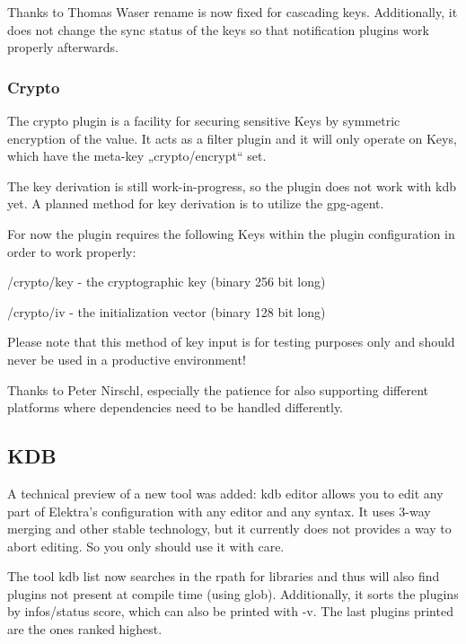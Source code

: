Thanks to Thomas Waser {\ttfamily rename} is now fixed for cascading keys. Additionally, it does not change the {\ttfamily sync} status of the keys so that notification plugins work properly afterwards.

\subsubsection*{Crypto}

The crypto plugin is a facility for securing sensitive Keys by symmetric encryption of the value. It acts as a filter plugin and it will only operate on Keys, which have the meta-\/key „crypto/encrypt“ set.

The key derivation is still work-\/in-\/progress, so the plugin does not work with kdb yet. A planned method for key derivation is to utilize the gpg-\/agent.

For now the plugin requires the following Keys within the plugin configuration in order to work properly\+:


\begin{DoxyEnumerate}
\item /crypto/key -\/ the cryptographic key (binary 256 bit long)
\item /crypto/iv -\/ the initialization vector (binary 128 bit long)
\end{DoxyEnumerate}

Please note that this method of key input is for testing purposes only and should never be used in a productive environment!

Thanks to Peter Nirschl, especially the patience for also supporting different platforms where dependencies need to be handled differently.

\subsection*{K\+D\+B}

A technical preview of a new tool was added\+: {\ttfamily kdb editor} allows you to edit any part of Elektra's configuration with any editor and any syntax. It uses 3-\/way merging and other stable technology, but it currently does not provides a way to abort editing. So you only should use it with care.

The tool {\ttfamily kdb list} now searches in the rpath for libraries and thus will also find plugins not present at compile time (using {\ttfamily glob}). Additionally, it sorts the plugins by {\ttfamily infos/status} score, which can also be printed with {\ttfamily -\/v}. The last plugins printed are the ones ranked highest.

